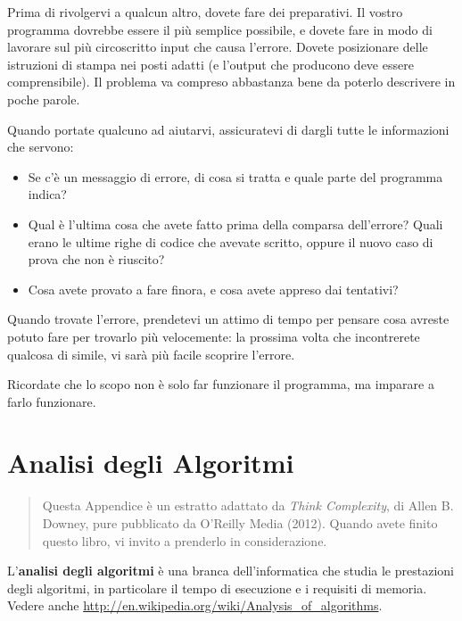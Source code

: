 \documentclass[10pt]{book}
\begin{document}
Prima di rivolgervi a qualcun altro, dovete fare dei preparativi. Il vostro programma dovrebbe essere il più semplice possibile, e dovete fare in modo di lavorare sul più circoscritto input che causa l'errore.
Dovete posizionare delle istruzioni di stampa nei posti adatti (e l'output che producono deve essere comprensibile). Il problema va compreso abbastanza bene da poterlo descrivere in poche parole.

Quando portate qualcuno ad aiutarvi, assicuratevi di dargli tutte le informazioni che servono:

\begin{itemize}

\item Se c'è un messaggio di errore, di cosa si tratta e quale parte del programma indica?

\item Qual è l'ultima cosa che avete fatto prima della comparsa dell'errore? Quali erano le ultime righe di codice che avevate scritto, oppure il nuovo caso di prova che non è riuscito?

\item Cosa avete provato a fare finora, e cosa avete appreso dai tentativi?

\end{itemize}

Quando trovate l'errore, prendetevi un attimo di tempo per pensare cosa avreste potuto fare per trovarlo più velocemente: la prossima volta che incontrerete qualcosa di simile, vi sarà più facile scoprire l'errore.

Ricordate che lo scopo non è solo far funzionare il programma, ma imparare a farlo funzionare.


\chapter{Analisi degli Algoritmi}
\label{algorithms}

\begin{quote}
Questa Appendice è un estratto adattato da {\it Think Complexity}, di
Allen B. Downey, pure pubblicato da O'Reilly Media (2012).  Quando avete finito questo libro, vi invito a prenderlo in considerazione.
\end{quote}

L'{\bf analisi degli algoritmi} è una branca dell'informatica che studia le prestazioni degli algoritmi, in particolare il tempo di esecuzione e i requisiti di memoria. Vedere anche
\url{http://en.wikipedia.org/wiki/Analysis_of_algorithms}.
 
\end{document}
